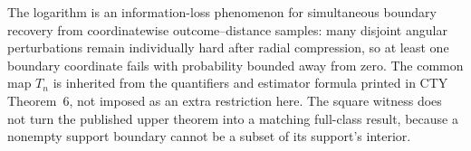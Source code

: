 The logarithm is an information-loss phenomenon for simultaneous boundary recovery from coordinatewise outcome--distance samples: many disjoint angular perturbations remain individually hard after radial compression, so at least one boundary coordinate fails with probability bounded away from zero.  The common map \(T_n\) is inherited from the quantifiers and estimator formula printed in CTY Theorem~6, not imposed as an extra restriction here.  The square witness does not turn the published upper theorem into a matching full-class result, because a nonempty support boundary cannot be a subset of its support's interior.